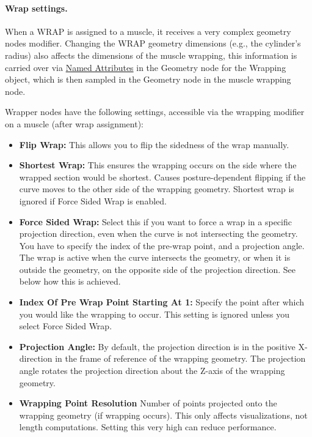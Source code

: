 \documentclass{article}
\begin{document}
\paragraph{Wrap settings.}

When a WRAP is assigned to a muscle, it receives a very complex geometry nodes modifier. Changing the WRAP geometry dimensions (e.g., the cylinder's radius) also affects the dimensions of the muscle wrapping, this information is carried over via \href{https://docs.blender.org/manual/en/latest/modeling/geometry_nodes/geometry/read/named_attribute.html}{Named Attributes} in the Geometry node for the Wrapping object, which is then sampled in the Geometry node in the muscle wrapping node.

Wrapper nodes have the following settings, accessible via the wrapping modifier on a muscle (after wrap assignment):

\begin{itemize}

\item \textbf{Flip Wrap:} This allows you to flip the sidedness of the wrap manually.
\item \textbf{Shortest Wrap:} This ensures the wrapping occurs on the side where the wrapped section would be shortest. Causes posture-dependent flipping if the curve moves to the other side of the wrapping geometry. Shortest wrap is ignored if Force Sided Wrap is enabled.
\item \textbf{Force Sided Wrap:} Select this if you want to force a wrap in a specific projection direction, even when the curve is not intersecting the geometry. You have to specify the index of the pre-wrap point, and a projection angle. The wrap is active when the curve intersects the geometry, or when it is outside the geometry, on the opposite side of the projection direction. See below how this is achieved.
\item \textbf{Index Of Pre Wrap Point Starting At 1:} Specify the point after which you would like the wrapping to occur. This setting is ignored unless you select Force Sided Wrap.
\item \textbf{Projection Angle:} By default, the projection direction is in the positive X-direction in the frame of reference of the wrapping geometry. The projection angle rotates the projection direction about the Z-axis of the wrapping geometry.
\item \textbf{Wrapping Point Resolution} Number of points projected onto the wrapping geometry (if wrapping occurs). This only affects visualizations, not length computations. Setting this very high can reduce performance.
\end{itemize}
\end{document}
